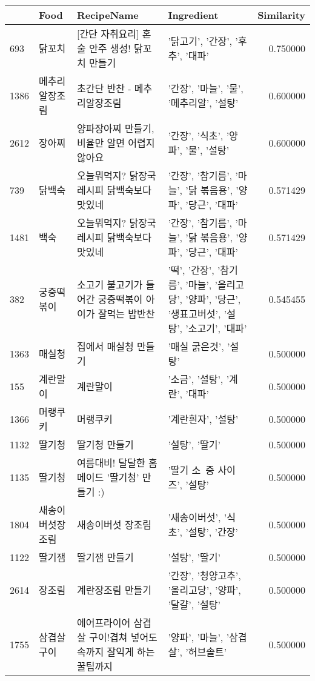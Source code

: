 \begin{tabular}{llllr}
\toprule
 & Food & RecipeName & Ingredient & Similarity \\
\midrule
693 & 닭꼬치 & [간단 자취요리] 혼술 안주 생성! 닭꼬치 만들기 & {'닭고기', '간장', '후추', '대파'} & 0.750000 \\
1386 & 메추리알장조림 & 초간단 반찬 - 메추리알장조림 & {'간장', '마늘', '물', '메추리알', '설탕'} & 0.600000 \\
2612 & 장아찌 & 양파장아찌 만들기, 비율만 알면 어렵지 않아요 ~ & {'간장', '식초', '양파', '물', '설탕'} & 0.600000 \\
739 & 닭백숙 & 오늘뭐먹지? 닭장국 레시피 닭백숙보다 맛있네 & {'간장', '참기름', '마늘', '닭 볶음용', '양파', '당근', '대파'} & 0.571429 \\
1481 & 백숙 & 오늘뭐먹지? 닭장국 레시피 닭백숙보다 맛있네 & {'간장', '참기름', '마늘', '닭 볶음용', '양파', '당근', '대파'} & 0.571429 \\
382 & 궁중떡볶이 & 소고기 불고기가 들어간 궁중떡볶이 아이가 잘먹는 밥반찬 & {'떡', '간장', '참기름', '마늘', '올리고당', '양파', '당근', '생표고버섯', '설탕', '소고기', '대파'} & 0.545455 \\
1363 & 매실청 & 집에서 매실청 만들기 & {'매실 굵은것', '설탕'} & 0.500000 \\
155 & 계란말이 & 계란말이 & {'소금', '설탕', '계란', '대파'} & 0.500000 \\
1366 & 머랭쿠키 & 머랭쿠키 & {'계란흰자', '설탕'} & 0.500000 \\
1132 & 딸기청 & 딸기청 만들기 & {'설탕', '딸기'} & 0.500000 \\
1135 & 딸기청 & 여름대비! 달달한 홈메이드 '딸기청' 만들기 :) & {'딸기 소~중 사이즈', '설탕'} & 0.500000 \\
1804 & 새송이버섯장조림 & 새송이버섯 장조림 & {'새송이버섯', '식초', '설탕', '간장'} & 0.500000 \\
1122 & 딸기잼 & 딸기잼 만들기 #8 홈카페레시피 아이들과 함께 만들어요~! & {'설탕', '딸기'} & 0.500000 \\
2614 & 장조림 & 계란장조림 만들기  & {'간장', '청양고추', '올리고당', '양파', '달걀', '설탕'} & 0.500000 \\
1755 & 삼겹살구이 & 에어프라이어 삼겹살 구이!겹쳐 넣어도 속까지 잘익게 하는 꿀팁까지 & {'양파', '마늘', '삼겹살', '허브솔트'} & 0.500000 \\
\bottomrule
\end{tabular}
